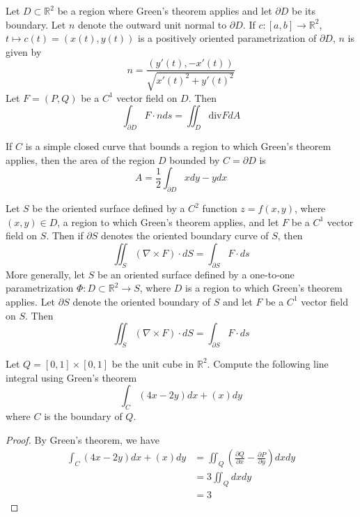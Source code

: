 \documentclass[openany]{book}
\newcommand{\R}{\mathbb{R}}
\begin{document}
\begin{prop}
    Let $D\subset\R^2$ be a region where Green's theorem applies and let $\partial D$ be its boundary. Let $n$ denote the outward unit normal to $\partial D$. If $c:[a,b]\to\R^2$, $t\mapsto c(t)=(x(t), y(t))$ is a positively oriented parametrization of $\partial D$, $n$ is given by 
    \begin{equation*}
        n=\frac{(y'(t), -x'(t))}{\sqrt{x'(t)^2+y'(t)^2}}
    \end{equation*}
    Let $F=(P,Q)$ be a $C^1$ vector field on $D$. Then 
    \begin{equation*}
        \int_{\partial D}F\cdot nds=\iint_D\text{div} FdA
    \end{equation*}
\end{prop}



\begin{prop}
    If $C$ is a simple closed curve that bounds a region to which Green's theorem applies, then the area of the region $D$ bounded by $C=\partial D$ is 
    \begin{equation*}
        A=\frac{1}{2}\int_{\partial D}xdy-ydx
    \end{equation*}
\end{prop}


\begin{thm}
    Let $S$ be the oriented surface defined by a $C^2$ function $z=f(x,y)$, where $(x,y)\in D$, a region to which Green's theorem applies, and let $F$ be a $C^1$ vector field on $S$. Then if $\partial S$ denotes the oriented boundary curve of $S$, then 
    \begin{equation*}
        \iint_S(\nabla\times F)\cdot dS=\int_{\partial S}F\cdot ds
    \end{equation*}
    More generally, let $S$ be an oriented surface defined by a one-to-one parametrization $\Phi: D\subset\R^2\to S$, where $D$ is a region to which Green's theorem applies. Let $\partial S$ denote the oriented boundary of $S$ and let $F$ be a $C^1$ vector field on $S$. Then 
    \begin{equation*}
        \iint_S(\nabla\times F)\cdot dS=\int_{\partial S}F\cdot ds
    \end{equation*}
\end{thm}


\newpage
\begin{prob}
    Let $Q=[0,1]\times[0,1]$ be the unit cube in $\R^2$. Compute the following line integral using Green's theorem
    \begin{equation*}
        \int_C(4x-2y)dx+(x)dy
    \end{equation*}
    where $C$ is the boundary of $Q$.
\end{prob}
\begin{proof}
    By Green's theorem, we have 
    \begin{align*}
        \int_C(4x-2y)dx+(x)dy&=\iint_Q\left(\frac{\partial Q}{\partial x}-\frac{\partial P}{\partial y}\right)dxdy\\
        &=3\iint_Qdxdy\\
        &=3
    \end{align*}
\end{proof}
\end{document}
